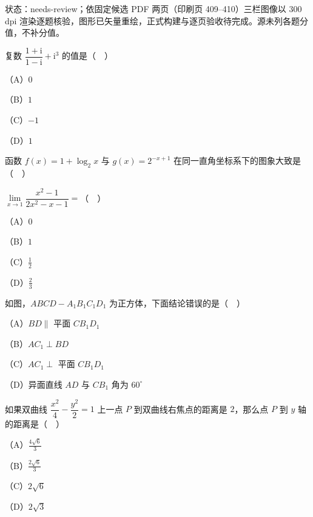 

状态：needs-review；依固定候选 PDF 两页（印刷页 409–410）三栏图像以 300 dpi 渲染逐题核验，图形已矢量重绘，正式构建与逐页验收待完成。源未列各题分值，不补分值。


\begin{question}
复数 $\dfrac{1+\mathrm{i}}{1-\mathrm{i}}+\mathrm{i}^3$ 的值是（　）

（A）$0$

（B）$1$

（C）$-1$

（D）$1$

\Needspace{0.4\textheight}
\end{question}
\begin{question}
函数 $f(x)=1+\log_2 x$ 与 $g(x)=2^{-x+1}$ 在同一直角坐标系下的图象大致是（　）
\nopagebreak[4]
\begin{center}\end{center}
\nopagebreak[4]
\end{question}
\begin{question}
$\lim\limits_{x\to1}\dfrac{x^2-1}{2x^2-x-1}=$（　）

（A）$0$

（B）$1$

（C）$\frac12$

（D）$\frac23$

\Needspace{0.4\textheight}
\end{question}
\begin{question}
如图，$ABCD-A_1B_1C_1D_1$ 为正方体，下面结论错误的是（　）
\nopagebreak[4]
\begin{center}\end{center}
\nopagebreak[4]
（A）$BD\parallel$ 平面 $CB_1D_1$

（B）$AC_1\perp BD$

（C）$AC_1\perp$ 平面 $CB_1D_1$

（D）异面直线 $AD$ 与 $CB_1$ 角为 $60^\circ$

\end{question}
\begin{question}
如果双曲线 $\dfrac{x^2}{4}-\dfrac{y^2}{2}=1$ 上一点 $P$ 到双曲线右焦点的距离是 $2$，那么点 $P$ 到 $y$ 轴的距离是（　）

（A）$\frac{4\sqrt6}{3}$

（B）$\frac{2\sqrt6}{3}$

（C）$2\sqrt6$

（D）$2\sqrt3$

\Needspace{0.4\textheight}
\end{question}
